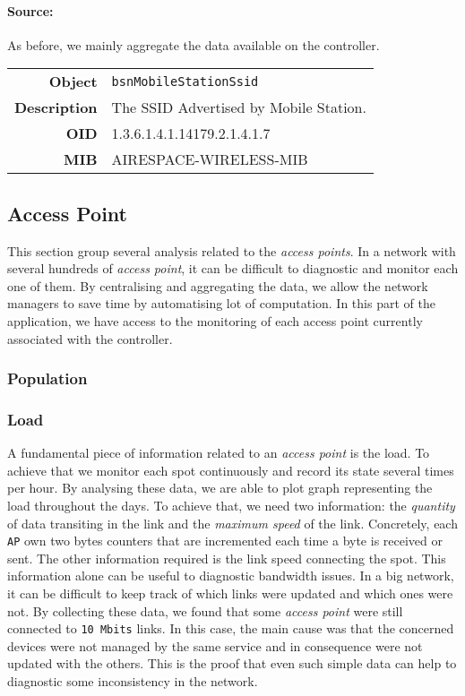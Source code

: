 \paragraph*{Source:} As before, we mainly aggregate the data available on the controller.

\begin{tabular}{|r l|}
\hline
\textbf{Object} & \texttt{bsnMobileStationSsid} \\
\textbf{Description} & \parbox{11cm}{The SSID Advertised by Mobile Station.} \\
\textbf{OID} & 1.3.6.1.4.1.14179.2.1.4.1.7 \\
\textbf{MIB} & AIRESPACE-WIRELESS-MIB \\
\hline
\end{tabular}

\subsection{Access Point}
This section group several analysis related to the \emph{access points}. In a network with several hundreds of \emph{access point}, it can be difficult to diagnostic and monitor each one of them. By centralising and aggregating the data, we allow the network managers to save time by automatising lot of computation. In this part of the application, we have access to the monitoring of each access point currently associated with the controller.
\subsubsection{Population}

\subsubsection*{Load}
A fundamental piece of information related to an \emph{access point} is the load. To achieve that we monitor each spot continuously and record its state several times per hour. By analysing these data, we are able to plot graph representing the load throughout the days. To achieve that, we need two information: the \textit{quantity} of data transiting in the link and the \textit{maximum speed} of the link. Concretely, each \texttt{AP} own two bytes counters that are incremented each time a byte is received or sent. The other information required is the link speed connecting the spot. This information alone can be useful to diagnostic bandwidth issues. In a big network, it can be difficult to keep track of which links were updated and which ones were not. By collecting these data, we found that some \emph{access point} were still connected to \texttt{10 Mbits} links. In this case, the main cause was that the concerned devices were not managed by the same service and in consequence were not updated with the others. %
This is the proof that even such simple data can help to diagnostic some inconsistency in the network.
